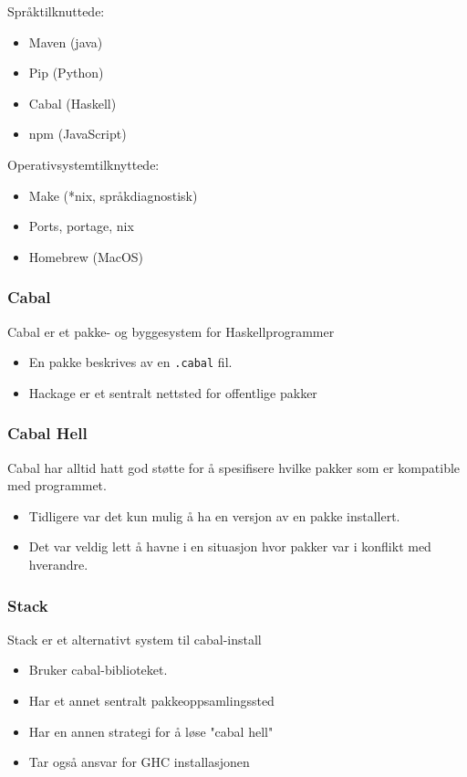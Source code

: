 \documentclass{article}
\begin{document}
Språktilknuttede:

\begin{itemize}
    \item Maven (java)
    \item Pip (Python)
    \item Cabal (Haskell)
    \item npm (JavaScript)
\end{itemize}

Operativsystemtilknyttede:

\begin{itemize}
    \item Make (*nix, språkdiagnostisk)
    \item Ports, portage, nix
    \item Homebrew (MacOS)
\end{itemize}


\subsubsection{Cabal}
Cabal er et pakke- og byggesystem for Haskellprogrammer

\begin{itemize}
    \item En pakke beskrives av en \texttt{.cabal} fil.
    \item Hackage er et sentralt nettsted for offentlige pakker
\end{itemize}

\subsubsection{Cabal Hell}
Cabal har alltid hatt god støtte for å spesifisere hvilke pakker som er kompatible med programmet.
\begin{itemize}
    \item Tidligere var det kun mulig å ha en versjon av en pakke installert.
    \item Det var veldig lett å havne i en situasjon hvor pakker var i konflikt med hverandre.
\end{itemize}

\subsubsection{Stack}
Stack er et alternativt system til cabal-install

\begin{itemize}
    \item Bruker cabal-biblioteket.
    \item Har et annet sentralt pakkeoppsamlingssted
    \item Har en annen strategi for å løse "cabal hell"
    \item Tar også ansvar for GHC installasjonen
\end{itemize}
\end{document}
